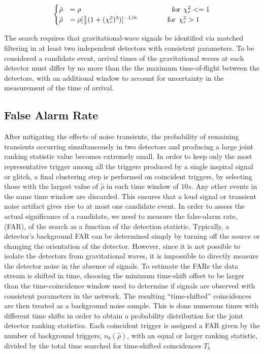 \documentclass[binding=0.6cm, LaM]{sapthesis}
\begin{document}
		\begin{equation}
		\begin{cases}
			\hat \rho &= \rho \hspace*{4.5cm}  \text{for} \hspace*{0.15cm}\chi^2_r <= 1 \\
			\hat \rho &= \rho[{1 \over 2} (1 + (\chi^2_r)^3)]^{-1/6}  \hspace*{1.5cm}  \text{for} \hspace*{0.15cm} \chi^2_r > 1
		\end{cases}
		\end{equation}

	The search requires that gravitational-wave signals be identified via matched filtering 
	in at least two independent detectors with consistent parameters. 
	To be considered a candidate event, arrival times of the gravitational waves at each detector 
	must differ by no more than the the maximum time-of-flight between the detectors, 
	with an additional window to account for uncertainty in the measurement of the time of arrival.
 
\subsection{False Alarm Rate}

	After mitigating the effects of noise transients, the probability of remaining transients 
	occurring simultaneously in two detectors and producing a large joint 
	ranking statistic value becomes extremely small.
	In order to keep only the most representative trigger among all the triggers produced by a single inspiral signal or glitch, 
	a final clustering step is performed on coincident triggers, 
	by selecting those with the largest value of $\hat \rho$ 
	in each time window of $10s$. 
	Any other events in the same time window are discarded. 
	This ensures that a loud signal or transient noise artifact gives rise to at most one candidate event.
	In order to assess the actual significance of a candidate, 
	we need to measure the false-alarm rate, (FAR), of the search as a function of the detection statistic.
	Typically, a detector’s background FAR can be determined 
	simply by turning off the source or changing the orientation of the detector. 
  	However, since it is not possible to isolate the detectors from gravitational waves, 
	it is impossible to directly measure the detector noise in the absence of signals.
 	To estimate the FARs the data stream is shifted in time, 
	choosing the minimum time-shift offset to be larger than the time-coincidence window 
	used to determine if signals are observed with consistent parameters in the network.
	The resulting “time-shifted” coincidences are then treated as a background noise sample. 
	This is done numerous times with different time shifts in order to obtain 
	a probability distribution for the joint detector ranking statistics. 
	Each coincident trigger is assigned a FAR given by the number 
	of background triggers, $n_b(\hat \rho)$, with an equal or larger ranking statistic, 
	divided by the total time searched for time-shifted coincidences $T_b$
		
\end{document}
